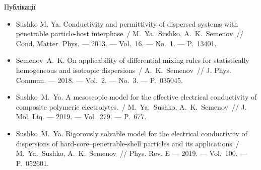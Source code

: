 \documentclass[10pt]{beamer}
\begin{document}
\begin{frame}{Публікації}
\footnotesize
  \begin{itemize}
    \item
    Sushko M. Ya. Conductivity and permittivity of dispersed systems 
    with penetrable particle-host interphase~/ M.~Ya.~Sushko, 
    A.~K.~Semenov~// Cond. Matter. Phys. --- 2013. --- Vol.~16. --- No.~1. 
    --- P.~13401.
    
    \item
    Semenov~A.~K. On applicability of differential mixing rules for
      statistically homogeneous and isotropic dispersions~/ A.~K.~Semenov~//
      J. Phys. Commun. --- 2018. --- Vol.~2. --- No.~3. --- P.~035045.
    
    \item
    Sushko~M.~Ya. A mesoscopic model for the effective electrical 
    conductivity of composite polymeric electrolytes.~/ M.~Ya.~Sushko,
    A.~K.~Semenov~// J. Mol. Liq. --- 2019. --- Vol.~279. --- P.~677.
    
    \item
    Sushko~M.~Ya. Rigorously solvable model for the electrical conductivity of dispersions of hard-core--penetrable-shell particles and its applications~/
    M.~Ya.~Su\-shko, A.~K.~Semenov~//
    Phys. Rev. E --- 2019. --- Vol.~100. --- P.~052601.
  \end{itemize}

\end{frame}
\end{document}
